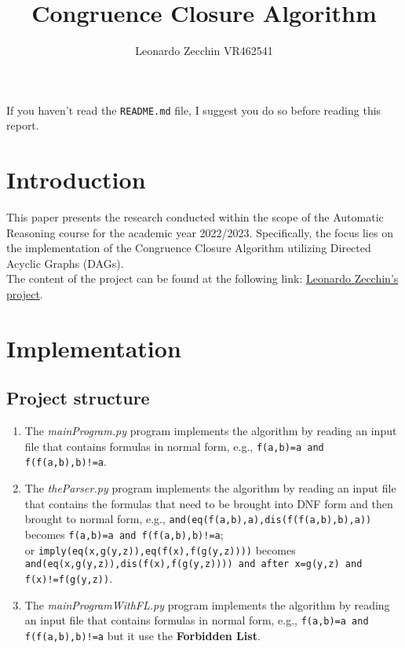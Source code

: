 \documentclass{article}
\title{Congruence Closure Algorithm}
\author{Leonardo Zecchin VR462541}
\begin{document}
\maketitle

If you haven't read the \texttt{README.md} file, I suggest you do so before reading this report.

\section{Introduction}

This paper presents the research conducted within the scope of the Automatic Reasoning course for the academic year 2022/2023. Specifically, the focus lies on the implementation of the Congruence Closure Algorithm utilizing Directed Acyclic Graphs (DAGs).\\
The content of the project can be found at the following link: \href{https://github.com/leonardozecchin/congruence-closure-AR.git}{Leonardo Zecchin's project}.

\section{Implementation}

\subsection{Project structure}

\begin{enumerate}
\item The \textit{mainProgram.py} program implements the algorithm by reading an input file that contains formulas in normal form, e.g., \texttt{f(a,b)=a and f(f(a,b),b)!=a}.
\item The \textit{theParser.py} program implements the algorithm by reading an input file that contains the formulas that need to be brought into DNF form and then brought to normal form, e.g., \texttt{and(eq(f(a,b),a),dis(f(f(a,b),b),a))} becomes \texttt{f(a,b)=a and f(f(a,b),b)!=a};\\ or \texttt{imply(eq(x,g(y,z)),eq(f(x),f(g(y,z))))} becomes \texttt{and(eq(x,g(y,z)),dis(f(x),f(g(y,z)))) and after \texttt{x=g(y,z) and f(x)!=f(g(y,z))}}.
\item The \textit{mainProgramWithFL.py} program implements the algorithm by reading an input file that contains formulas in normal form, e.g., \texttt{f(a,b)=a and f(f(a,b),b)!=a} but it use the \textbf{Forbidden List}.
\end{enumerate}
\end{document}
